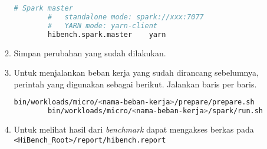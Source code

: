 \begin{enumerate}
\begin{enumerate}
\begin{lstlisting}[language=bash]
		# Spark master
		#   standalone mode: spark://xxx:7077
		#   YARN mode: yarn-client
		hibench.spark.master    yarn
      \end{lstlisting}
    \item Simpan perubahan yang sudah dilakukan.
    \item Untuk menjalankan beban kerja yang sudah dirancang sebelumnya, perintah yang digunakan sebagai berikut. Jalankan baris per baris.
      \begin{lstlisting}[language=bash]
	    bin/workloads/micro/<nama-beban-kerja>/prepare/prepare.sh
	    bin/workloads/micro/<nama-beban-kerja>/spark/run.sh
      \end{lstlisting}
    \item Untuk melihat hasil dari \textit{benchmark} dapat mengakses berkas pada \verb|<HiBench_Root>/report/hibench.report|
  \end{enumerate}
\end{enumerate}